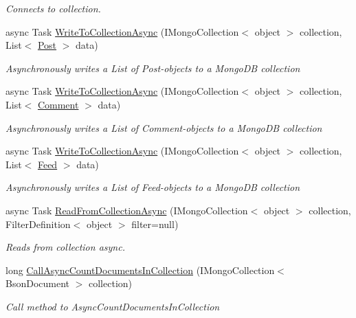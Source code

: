 \begin{DoxyCompactItemize}
\begin{DoxyCompactList}\small\item\em Connects to collection. \end{DoxyCompactList}\item 
async Task \hyperlink{class_client_1_1_d_b_client_ae627d0670aa2d71fef0d9fd64c8f9328}{Write\+To\+Collection\+Async} (I\+Mongo\+Collection$<$ object $>$ collection, List$<$ \hyperlink{class_data_1_1_facebook_objects_1_1_post}{Post} $>$ data)
\begin{DoxyCompactList}\small\item\em Asynchronously writes a List of Post-\/objects to a Mongo\+DB collection \end{DoxyCompactList}\item 
async Task \hyperlink{class_client_1_1_d_b_client_a2ad8897568e3885fcd6814366aff1cca}{Write\+To\+Collection\+Async} (I\+Mongo\+Collection$<$ object $>$ collection, List$<$ \hyperlink{class_data_1_1_facebook_objects_1_1_comment}{Comment} $>$ data)
\begin{DoxyCompactList}\small\item\em Asynchronously writes a List of Comment-\/objects to a Mongo\+DB collection \end{DoxyCompactList}\item 
async Task \hyperlink{class_client_1_1_d_b_client_a8ce3c915e127e8b510f6441c50a138e4}{Write\+To\+Collection\+Async} (I\+Mongo\+Collection$<$ object $>$ collection, List$<$ \hyperlink{class_data_1_1_facebook_objects_1_1_feed}{Feed} $>$ data)
\begin{DoxyCompactList}\small\item\em Asynchronously writes a List of Feed-\/objects to a Mongo\+DB collection \end{DoxyCompactList}\item 
async Task \hyperlink{class_client_1_1_d_b_client_aea382fb64f8e3f44fd52fddb841c09a2}{Read\+From\+Collection\+Async} (I\+Mongo\+Collection$<$ object $>$ collection, Filter\+Definition$<$ object $>$ filter=null)
\begin{DoxyCompactList}\small\item\em Reads from collection async. \end{DoxyCompactList}\item 
long \hyperlink{class_client_1_1_d_b_client_a488a378843f1a501333a86dd9d09851e}{Call\+Async\+Count\+Documents\+In\+Collection} (I\+Mongo\+Collection$<$ Bson\+Document $>$ collection)
\begin{DoxyCompactList}\small\item\em Call method to Async\+Count\+Documents\+In\+Collection \end{DoxyCompactList}\end{DoxyCompactItemize}


